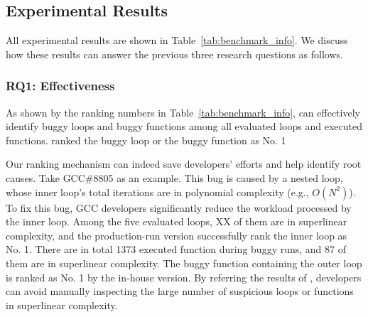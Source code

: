 \subsection{Experimental Results}
\label{sec:results}

All experimental results are shown in Table~\ref{tab:benchmark_info}.
We discuss how these results can answer the previous three research questions as follows.


\subsubsection{RQ1: Effectiveness}
As shown by the ranking numbers in Table~\ref{tab:benchmark_info},
\Tool can effectively identify buggy loops and buggy functions 
among all evaluated loops and executed functions. 
\Tool ranked the buggy loop or the buggy function as No. 1 

Our ranking mechanism can indeed save developers' efforts 
and help identify root causes. 
Take GCC\#8805 as an example.
This bug is caused by a nested loop, 
whose inner loop's total iterations are in polynomial complexity (e.g., $O(N^2)$).
To fix this bug, GCC developers significantly reduce 
the workload processed by the inner loop. 
Among the five evaluated loops, {\color{red} XX} of them are in superlinear complexity, 
and the production-run version successfully rank the inner loop as No. 1.
There are in total 1373 executed function during buggy runs,
and 87 of them are in superlinear complexity. 
The buggy function containing the outer loop is ranked as No. 1 
by the in-house version. 
By referring the results of \Tool, 
developers can avoid manually inspecting the large number of  
suspicious loops or functions in superlinear complexity. 


